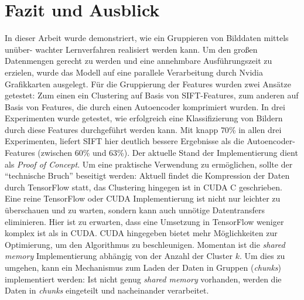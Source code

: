\chapter{Fazit und Ausblick}

In dieser Arbeit wurde demonstriert, wie ein Gruppieren von Bilddaten mittels unüber- wachter Lernverfahren realisiert werden kann. Um den großen Datenmengen gerecht zu werden und eine annehmbare Ausführungszeit zu erzielen, wurde das Modell auf eine parallele Verarbeitung durch Nvidia Grafikkarten ausgelegt. Für die Gruppierung der Features wurden zwei Ansätze getestet: Zum einen ein Clustering auf Basis von SIFT-Features, zum anderen auf Basis von Features, die durch einen Autoencoder komprimiert wurden. In drei Experimenten wurde getestet, wie erfolgreich eine Klassifizierung von Bildern durch diese Features durchgeführt werden kann. Mit knapp $70$\% in allen drei Experimenten, liefert SIFT hier deutlich bessere Ergebnisse als die Autoencoder-Features (zwischen $60$\% und $63$\%). \newline 
Der aktuelle Stand der Implementierung dient als \textit{Proof of Concept}. Um eine praktische Verwendung zu ermöglichen, sollte der \enquote{technische Bruch} beseitigt werden: Aktuell findet die Kompression der Daten durch TensorFlow statt, das Clustering hingegen ist in CUDA C geschrieben. Eine reine TensorFlow oder CUDA Implementierung ist nicht nur leichter zu überschauen und zu warten, sondern kann auch unnötige Datentransfers eliminieren. Hier ist zu erwarten, dass eine Umsetzung in TensorFlow weniger komplex ist als in CUDA. CUDA hingegeben bietet mehr Möglichkeiten zur Optimierung, um den Algorithmus zu beschleunigen. Momentan ist die \textit{shared memory} Implementierung abhängig von der Anzahl der Cluster $k$. Um dies zu umgehen, kann ein Mechanismus zum Laden der Daten in Gruppen (\textit{chunks}) implementiert werden: Ist nicht genug \textit{shared memory} vorhanden, werden die Daten in \textit{chunks} eingeteilt und nacheinander verarbeitet.
